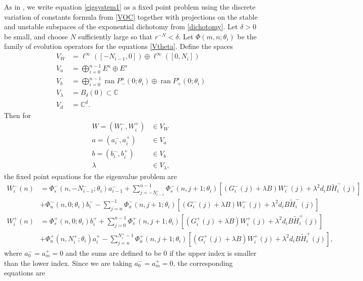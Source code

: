 \documentclass[12pt]{elsarticle}
\def\C{{\mathbb C}}
\DeclareMathOperator{\ran}{ran}
\begin{document}
As in \cite{Sandstede1998}, we write equation \cref{eigsystem1} as a fixed point problem using the discrete variation of constants formula from \cref{VOC} together with projections on the stable and unstable subspaces of the exponential dichotomy from \cref{dichotomy}. Let $\delta > 0$ be small, and choose $N$ sufficiently large so that $r^{-N} < \delta$. Let $\Phi(m, n; \theta_i)$ be the family of evolution operators for the equations \cref{Vtheta}. Define the spaces
\begin{align*}
V_W &= \ell^\infty([-N_{i-1}, 0]) \oplus \ell^\infty([0, N_i])  \\
V_a &= \bigoplus_{i=0}^{n-1} E^u \oplus E^s \\
V_b &= \bigoplus_{i=0}^{n-1} \ran P_-^u(0; \theta_i) \oplus \ran P_+^s(0; \theta_i)\\
V_\lambda &= B_\delta(0) \subset \C \\
V_d &= \C^d.
\end{align*}
Then for
\begin{align*}
W = (W_i^-, W_i^+) &\in V_W \\
a = (a_i^-, a_i^+) &\in V_a \\
b = (b_i^-, b_i^+) &\in V_b \\
\lambda &\in V_\lambda,
\end{align*}
the fixed point equations for the eigenvalue problem are
\begin{equation}\label{fpeig}
\begin{aligned}
W_i^-(n) &= 
\Phi_s^-(n, -N_{i-1}^-; \theta_i) a_{i-1}^- + \sum_{j = -N_{i-1}^-}^{n-1} \Phi_s^-(n, j+1; \theta_i)
[(G_i^-(j) + \lambda B) W_i^-(j) + \lambda^2 d_i B \tilde{H}_i^-(j)]
 \\
&+ \Phi_u^-(n, 0; \theta_i) b_i^- - \sum_{j = n}^{-1} \Phi_u^-(n, j+1; \theta_i) 
[(G_i^-(j) + \lambda B) W_i^-(j) + \lambda^2 d_i B \tilde{H}_i^-(j)] \\
W_i^+(n) &= \Phi_s^+(n, 0; \theta_i) b_i^+ + \sum_{j = 0}^{n-1} \Phi_s^+(n, j+1; \theta_i) 
[(G_i^+(j) + \lambda B) W_i^+(j) + \lambda^2 d_i B \tilde{H}_i^+(j)] \\
&+ \Phi_u^+(n, N_i^+; \theta_i) a_i^+ - \sum_{j = n}^{N_i^+-1} \Phi_u^+(n, j+1; \theta_i) 
[(G_i^+(j) + \lambda B) W_i^+(j) + \lambda^2 d_i B \tilde{H}_i^+(j)],
\end{aligned}
\end{equation}
where $a_0^- = a_m^+ = 0$ and the sums are defined to be $0$ if the upper index is smaller than the lower index. Since we are taking $a_0^- = a_m^+ = 0$, the corresponding equations are
\end{document}
